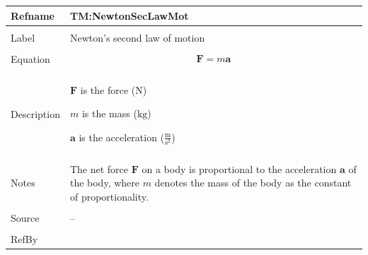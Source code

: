 \documentclass[12pt]{article}
\begin{document}
\begin{minipage}{\textwidth}
\begin{tabular}{>{\raggedright}p{}>{\raggedright\arraybackslash}p{}}
\toprule \textbf{Refname} & \textbf{TM:NewtonSecLawMot}
\label{TM:NewtonSecLawMot}
\\ \midrule \\
Label & Newton's second law of motion
        
\\ \midrule \\
Equation & \begin{displaymath}
           \mathbf{F}=m \mathbf{a}
           \end{displaymath}
\\ \midrule \\
Description & \begin{symbDescription}
              \item{$\mathbf{F}$ is the force (${\text{N}}$)}
              \item{$m$ is the mass (${\text{kg}}$)}
              \item{$\mathbf{a}$ is the acceleration ($\frac{\text{m}}{\text{s}^{2}}$)}
              \end{symbDescription}
\\ \midrule \\
Notes & The net force $\mathbf{F}$ on a body is proportional to the acceleration $\mathbf{a}$ of the body, where $m$ denotes the mass of the body as the constant of proportionality.
        
\\ \midrule \\
Source & --
         
\\ \midrule \\
RefBy & 
\\ \bottomrule
\end{tabular}
\end{minipage}
\vspace{\baselineskip}
\noindent
\end{document}
